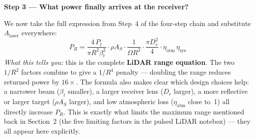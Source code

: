 \documentclass[12pt, a4paper]{article}
\begin{document}
\textbf{Step 3 --- What power finally arrives at the receiver?}

We now take the full expression from Step~4 of the four-step chain and
substitute $A_\text{laser}$ everywhere:
\[
  \boxed{
  P_R
  = \frac{4\,P_t}{\pi R^2 \beta_t^2}
    \cdot \rho A_S
    \cdot \frac{1}{\Omega R^2}
    \cdot \frac{\pi D_r^2}{4}
    \cdot \eta_\text{atm}\,\eta_\text{sys}
  }
\]
\textit{What this tells you:} this is the complete \textbf{LiDAR range
equation}.  The two $1/R^2$ factors combine to give a $1/R^4$ penalty ---
doubling the range reduces returned power by $16\times$.  The formula
also makes clear which design choices help: a narrower beam ($\beta_t$
smaller), a larger receiver lens ($D_r$ larger), a more reflective or
larger target ($\rho A_S$ larger), and low atmospheric loss ($\eta_\text{atm}$
close to~1) all directly increase $P_R$.  This is exactly what limits the
maximum range mentioned back in Section~2 (the five limiting factors in the
pulsed LiDAR notebox) --- they all appear here explicitly.
\end{document}
